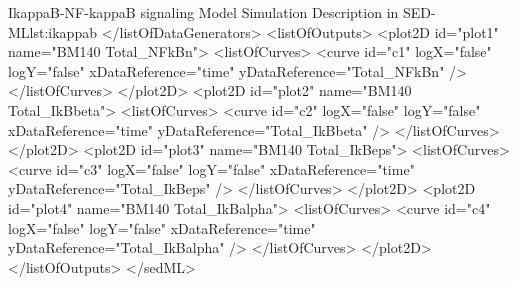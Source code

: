 \begin{myXmlLst}{IkappaB-NF-kappaB signaling Model Simulation Description in SED-ML}{lst:ikappab}
  </listOfDataGenerators>
  <listOfOutputs>
    <plot2D id="plot1" name="BM140 Total_NFkBn">
      <listOfCurves>
        <curve  id="c1" logX="false" logY="false" xDataReference="time" 
        yDataReference="Total_NFkBn" />
      </listOfCurves>
    </plot2D>
    <plot2D id="plot2" name="BM140 Total_IkBbeta">
      <listOfCurves>
        <curve  id="c2" logX="false" logY="false" xDataReference="time"
        yDataReference="Total_IkBbeta" />
      </listOfCurves>
    </plot2D>
    <plot2D id="plot3" name="BM140 Total_IkBeps">
      <listOfCurves>
        <curve  id="c3" logX="false" logY="false" xDataReference="time"
        yDataReference="Total_IkBeps" />
      </listOfCurves>
    </plot2D>
    <plot2D id="plot4" name="BM140 Total_IkBalpha">
      <listOfCurves>
        <curve id="c4" logX="false" logY="false" xDataReference="time" 
        yDataReference="Total_IkBalpha" />
      </listOfCurves>
    </plot2D>
  </listOfOutputs>
</sedML>
\end{myXmlLst}



